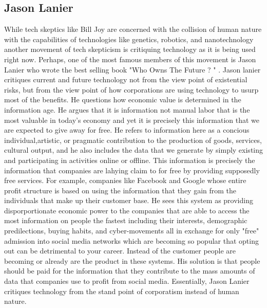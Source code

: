 \subsection{Jason Lanier}
  While tech skeptics like Bill Joy are concerned with the collision of human nature with the capabilities of technologies like 
genetics, robotics, and nanotechnology another movement of tech skepticism is critiquing technology as it is being used right now. Perhaps, one of the most famous members of this movement is Jason Lanier who wrote the best selling book "Who Owns The Future ? " \cite{lanier2014owns}. Jason lanier critiques current and future technology not from the view point of existential risks, but from the view point of how corporations are using technology to usurp most of the benefits. He questions how economic value is determined in the information age. He argues that it is information not manual labor that is the most valuable in today's economy and yet it is precisely this information that we are expected to give away for free. He refers to information here as a concious individual,artistic, or pragmatic contribution to the production of goods, services, cultural output, and he also includes the data that we generate by simply existing and participating in activities online or offline. This information is precisely the information that companies are lahying claim to for free by  providing supposedly free services. For example, companies  like Facebook and Google  whose entire profit structure is based on using the information that they gain from the individuals that make up their customer base. He sees this system as providing disporportionate economic power to the companies that are able to access the most information on people the fastest including their interests, demographic predilections, buying habits, and cyber-movements all in exchange for only "free" admission into social media networks which are becoming so popular that opting out can be detrimental to your career. Instead of the customer people are becoming or already are the product in these systems.  His solution is that people should be paid for the information that they contribute to the mass amounts of data that companies use to profit from social media. Essentially, Jason Lanier critiques technology from the stand point of corporatism instead of human nature. 
\label{sec:-jason}


